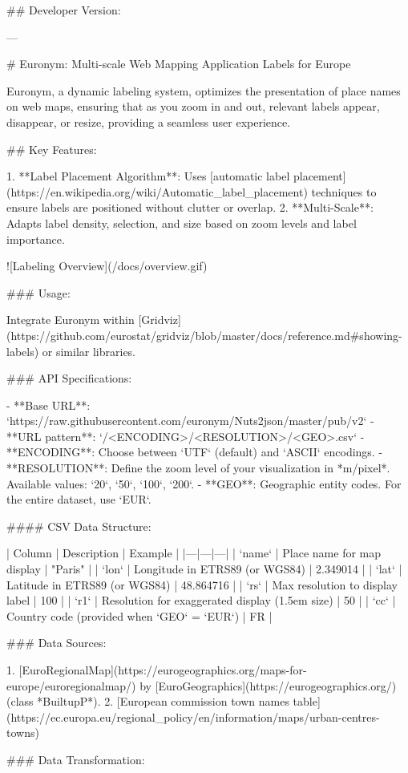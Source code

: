 ## Developer Version:

---

# Euronym: Multi-scale Web Mapping Application Labels for Europe

Euronym, a dynamic labeling system, optimizes the presentation of place names on web maps, ensuring that as you zoom in and out, relevant labels appear, disappear, or resize, providing a seamless user experience.

## Key Features:

1. **Label Placement Algorithm**: Uses [automatic label placement](https://en.wikipedia.org/wiki/Automatic_label_placement) techniques to ensure labels are positioned without clutter or overlap.
2. **Multi-Scale**: Adapts label density, selection, and size based on zoom levels and label importance.

![Labeling Overview](/docs/overview.gif)

### Usage:

Integrate Euronym within [Gridviz](https://github.com/eurostat/gridviz/blob/master/docs/reference.md#showing-labels) or similar libraries.

### API Specifications:

- **Base URL**: `https://raw.githubusercontent.com/euronym/Nuts2json/master/pub/v2`
- **URL pattern**:  `/<ENCODING>/<RESOLUTION>/<GEO>.csv`
    - **ENCODING**: Choose between `UTF` (default) and `ASCII` encodings.
    - **RESOLUTION**: Define the zoom level of your visualization in *m/pixel*. Available values: `20`, `50`, `100`, `200`.
    - **GEO**: Geographic entity codes. For the entire dataset, use `EUR`.

#### CSV Data Structure:

| Column | Description | Example |
|---|---|---|
| `name` | Place name for map display | "Paris" |
| `lon` | Longitude in ETRS89 (or WGS84) | 2.349014 |
| `lat` | Latitude in ETRS89 (or WGS84) | 48.864716 |
| `rs` | Max resolution to display label | 100 |
| `r1` | Resolution for exaggerated display (1.5em size) | 50 |
| `cc` | Country code (provided when `GEO` = `EUR`) | FR |

### Data Sources:

1. [EuroRegionalMap](https://eurogeographics.org/maps-for-europe/euroregionalmap/) by [EuroGeographics](https://eurogeographics.org/) (class *BuiltupP*).
2. [European commission town names table](https://ec.europa.eu/regional_policy/en/information/maps/urban-centres-towns)

### Data Transformation:

